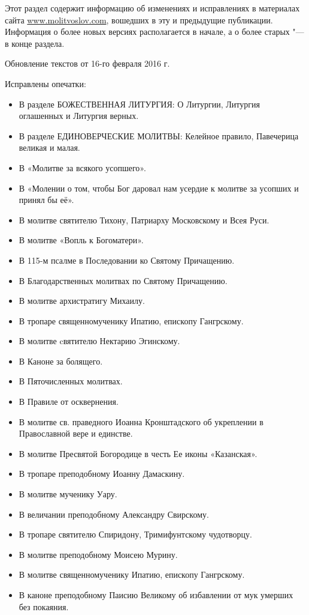 \renewcommand{\ornament}{uzor_begin_9}

Этот раздел содержит информацию об изменениях и исправлениях в материалах сайта \url{www.molitvoslov.com}, вошедших в эту и предыдущие публикации. Информация о более новых версиях располагается в начале, а о более старых "--- в конце раздела.


{\small Обновление текстов от 16-го февраля 2016 г.

Исправлены опечатки:

\begin{itemize}

\item В разделе БОЖЕСТВЕННАЯ ЛИТУРГИЯ: О Литургии, Литургия оглашенных и Литургия верных.
\item В разделе ЕДИНОВЕРЧЕСКИЕ МОЛИТВЫ: Келейное правило, Павечерица великая и малая.
\item В «Молитве за всякого усопшего».
\item В «Молении о том, чтобы Бог даровал нам усердие к молитве за усопших и принял бы её».
\item В молитве святителю Тихону, Патриарху Московскому и Всея Руси.
\item В молитве «Вопль к Богоматери».
\item В 115-м псалме в Последовании ко Святому Причащению.
\item В Благодарственных молитвах по Святому Причащению.
\item В молитве архистратигу Михаилу.
\item В тропаре священномученику Ипатию, епископу Гангрскому.
\item В молитве cвятителю Нектарию Эгинскому.
\item В Каноне за болящего.
\item В Пяточисленных молитвах.
\item В Правиле от осквернения.
\item В молитве св. праведного Иоанна Кронштадского об укреплении в Православной вере и единстве.
\item В молитве Пресвятой Богородице в честь Ее иконы «Казанская».
\item В тропаре преподобному Иоанну Дамаскину.
\item В молитве мученику Уару.
\item В величании преподобному Александру Свирскому.
\item В тропаре святителю Спиридону, Тримифунтскому чудотворцу.
\item В молитве преподобному Моисею Мурину.
\item В молитве священномученику Ипатию, епископу Гангрскому.
\item В каноне преподобному Паисию Великому об избавлении от мук умерших без покаяния.


\end{itemize}}
